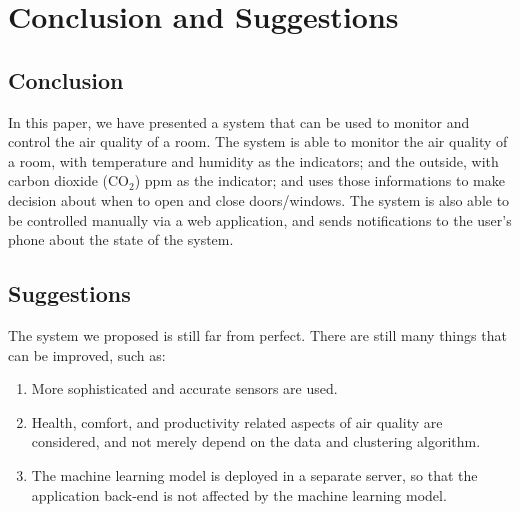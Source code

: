 \section{Conclusion and Suggestions}

\subsection{Conclusion}
In this paper, we have presented a system that can be
used to monitor and control the air quality of a room.
The system is able to monitor the air quality of a room,
with temperature and humidity as the indicators; and
the outside, with carbon dioxide (CO$_2$) ppm as the indicator;
and uses those informations to make decision about when to
open and close doors/windows.
The system is also able to be controlled manually via a web
application, and sends notifications to the user's phone
about the state of the system.

\subsection{Suggestions}
The system we proposed is still far from perfect.
There are still many things that can be improved, such as:
\begin{enumerate}
      \item More sophisticated and accurate sensors are
            used.
      \item Health, comfort, and productivity related
            aspects of air quality are considered,
            and not merely depend on the data and
            clustering algorithm.
      \item The machine learning model is deployed
            in a separate server, so that the
            application back-end is not affected
            by the machine learning model.
\end{enumerate}
